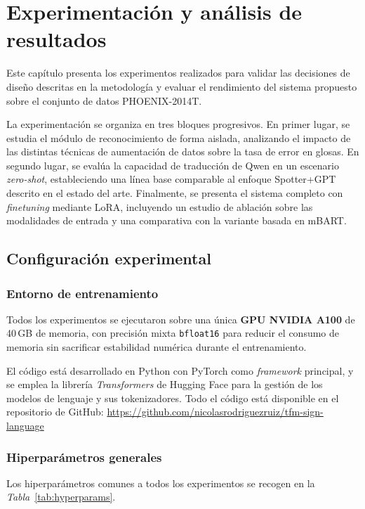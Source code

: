 \chapter{Experimentación y análisis de resultados}\label{ch:experimentacion}
Este capítulo presenta los experimentos realizados para validar las decisiones de diseño descritas en la metodología y evaluar el rendimiento del sistema propuesto sobre el conjunto de datos PHOENIX-2014T\@.

La experimentación se organiza en tres bloques progresivos.
En primer lugar, se estudia el módulo de reconocimiento de forma aislada, analizando el impacto de las distintas técnicas de aumentación de datos sobre la tasa de error en glosas.
En segundo lugar, se evalúa la capacidad de traducción de Qwen en un escenario \textit{zero-shot}, estableciendo una línea base comparable al enfoque Spotter+GPT descrito en el estado del arte.
Finalmente, se presenta el sistema completo con \textit{finetuning} mediante LoRA, incluyendo un estudio de ablación sobre las modalidades de entrada y una comparativa con la variante basada en mBART.

\section{Configuración experimental}

\subsection{Entorno de entrenamiento}
Todos los experimentos se ejecutaron sobre una única \textbf{GPU NVIDIA A100} de 40\,GB de memoria, con precisión mixta \texttt{bfloat16} para reducir el consumo de memoria sin sacrificar estabilidad numérica durante el entrenamiento.

El código está desarrollado en Python con PyTorch como \textit{framework} principal, y se emplea la librería \textit{Transformers} de Hugging Face para la gestión de los modelos de lenguaje y sus tokenizadores.
Todo el código está disponible en el repositorio de GitHub: \url{https://github.com/nicolasrodriguezruiz/tfm-sign-language}

\subsection{Hiperparámetros generales}
Los hiperparámetros comunes a todos los experimentos se recogen en la \textit{Tabla}~\ref{tab:hyperparams}.


